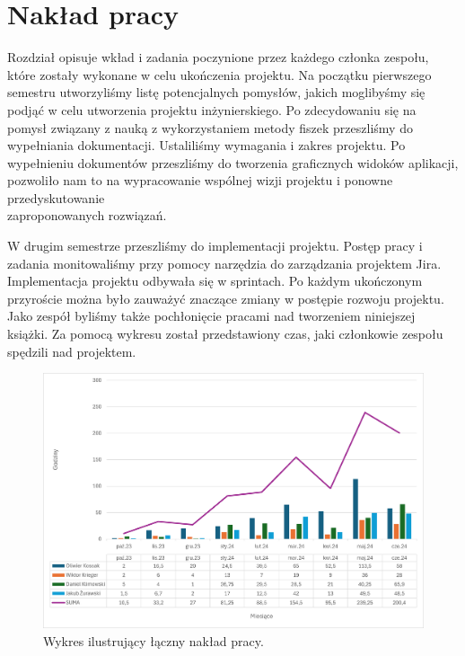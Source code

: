 \chapter{Nakład pracy}

Rozdział opisuje wkład i zadania poczynione przez każdego członka zespołu, które zostały wykonane w celu ukończenia projektu. Na początku pierwszego semestru utworzyliśmy listę potencjalnych pomysłów, jakich moglibyśmy się podjąć w celu utworzenia projektu inżynierskiego. Po zdecydowaniu się na pomysł związany z nauką z wykorzystaniem metody fiszek przeszliśmy do wypełniania dokumentacji. Ustaliliśmy wymagania i zakres projektu. Po wypełnieniu dokumentów przeszliśmy do tworzenia graficznych widoków aplikacji, pozwoliło nam to na wypracowanie wspólnej wizji projektu i ponowne przedyskutowanie \\zaproponowanych rozwiązań.


\indent W drugim semestrze przeszliśmy do implementacji projektu. Postęp pracy i zadania monitowaliśmy przy pomocy narzędzia do zarządzania projektem Jira. Implementacja projektu odbywała się w sprintach. Po każdym ukończonym przyroście można było zauważyć znaczące zmiany w postępie rozwoju projektu. Jako zespół byliśmy także pochłonięcie pracami nad tworzeniem niniejszej książki. Za pomocą wykresu został przedstawiony czas, jaki członkowie zespołu spędzili nad projektem.

\begin{figure}[H]
    \centering
    \includegraphics[width=1\textwidth]{chapters/chapter_11/naklad_pracy_wykres}
    \caption{Wykres ilustrujący łączny nakład pracy.}
    \label{img:wykres_nakładu_pracy}
\end{figure}

